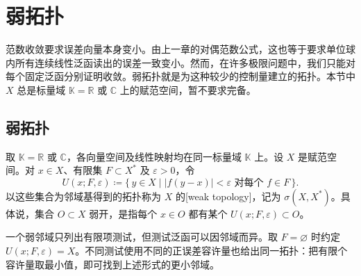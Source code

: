 \section{弱拓扑}
\label{b1:sec:0901}

范数收敛要求误差向量本身变小。由上一章的对偶范数公式，这也等于要求单位球内所有连续线性泛函读出的误差一致变小。然而，在许多极限问题中，我们只能对每个固定泛函分别证明收敛。弱拓扑就是为这种较少的控制量建立的拓扑。本节中 \(X\) 总是标量域 \(\mathbb K=\mathbb R\) 或 \(\mathbb C\) 上的赋范空间，暂不要求完备。

\subsection{弱拓扑}
\label{b1:subsec:090101}

\begin{definition}\label{b1:def:weak-topology}
取 \(\mathbb K=\mathbb R\) 或 \(\mathbb C\)，各向量空间及线性映射均在同一标量域 \(\mathbb K\) 上。设 \(X\) 是赋范空间。对 \(x\in X\)、有限集 \(F\subset X^*\) 及 \(\varepsilon>0\)，令
\[
 U(x;F,\varepsilon)
 \coloneqq\{\,y\in X\mid |f(y-x)|<\varepsilon\text{ 对每个 }f\in F\,\}.
\]
以这些集合为邻域基得到的拓扑称为 \(X\) 的[weak topology]，记为 \(\sigma(X,X^*)\)。具体说，集合 \(O\subset X\) 弱开，是指每个 \(x\in O\) 都有某个 \(U(x;F,\varepsilon)\subset O\)。
\end{definition}

一个弱邻域只列出有限项测试，但测试泛函可以因邻域而异。取 \(F=\varnothing\) 时约定 \(U(x;F,\varepsilon)=X\)。不同测试使用不同的正误差容许量也给出同一拓扑：把有限个容许量取最小值，即可找到上述形式的更小邻域。

